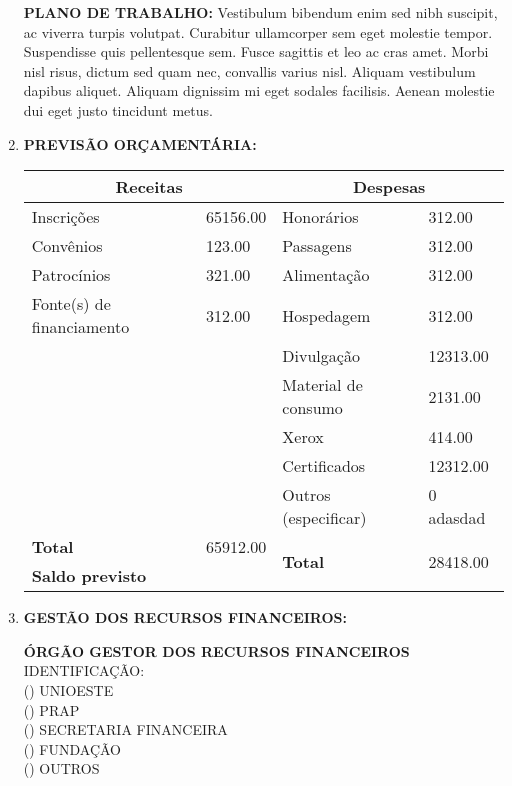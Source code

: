 \documentclass[12pt,a4paper,oneside]{article}%
\begin{document}
\begin{enumerate}
{\begin{tabularx}{\linewidth}
\hline%
\end{tabularx}%
\linebreak%
\begin{mdframed}[innertopmargin=5pt, innerleftmargin=3pt, innerrightmargin=3pt, topline=false]%
\textbf{PLANO DE TRABALHO: }%
Vestibulum bibendum enim sed nibh suscipit, ac viverra turpis volutpat. Curabitur ullamcorper sem eget molestie tempor. Suspendisse quis pellentesque sem. Fusce sagittis et leo ac cras amet.%
\newline%
Morbi nisl risus, dictum sed quam nec, convallis varius nisl. Aliquam vestibulum dapibus aliquet. Aliquam dignissim mi eget sodales facilisis. Aenean molestie dui eget justo tincidunt metus.%
\newline%
\end{mdframed}%
}%
\item%
\textbf{PREVISÃO ORÇAMENTÁRIA: \\}%
\begin{tabularx}{\linewidth}{|X|X|X|X|}%
\hline%
\multicolumn{2}{|c|}{\textbf{Receitas}}&\multicolumn{2}{c|}{\textbf{Despesas}}\\%
\hline%
Inscrições&65156.00&Honorários&312.00\\%
\hline%
Convênios&123.00&Passagens&312.00\\%
\hline%
Patrocínios&321.00&Alimentação&312.00\\%
\hline%
Fonte(s) de financiamento&312.00&Hospedagem&312.00\\%
\hline%
&&Divulgação&12313.00\\%
\hline%
&&Material de consumo&2131.00\\%
\hline%
&&Xerox&414.00\\%
\hline%
&&Certificados&12312.00\\%
\hline%
&&Outros (especificar)&0\newline%
adasdad\\%
\hline%
\textbf{Total}&65912.00&\multirow{2}{*}{\textbf{Total}}&\multirow{2}{*}{28418.00}\\%
\cline{1-2}%
\textbf{Saldo previsto}&&&\\%
\hline%
\end{tabularx}%
\item%
\textbf{GESTÃO DOS RECURSOS FINANCEIROS: \\}%
\begin{mdframed}[innertopmargin=5pt, innerleftmargin=3pt, innerrightmargin=3pt]%
\textbf{ÓRGÃO GESTOR DOS RECURSOS FINANCEIROS \\}%
IDENTIFICAÇÃO: \\%
() UNIOESTE \\%
() PRAP \\%
() SECRETARIA FINANCEIRA \\%
() FUNDAÇÃO \\%
() OUTROS \\%
\end{mdframed}%
\end{enumerate}%
\end{document}
